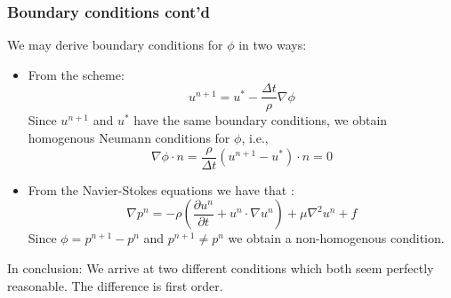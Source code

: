 \begin{frame}
\frametitle{Boundary conditions cont'd}
We may derive boundary conditions for 
$\phi$ in two ways: 
\begin{itemize}
\item From the scheme:  
\[
u^{n+1} =  u^*- \frac{\Delta t}{\rho} \nabla \phi 
\]
Since $u^{n+1}$ and $u^*$ have the same boundary conditions, we obtain homogenous
Neumann conditions for $\phi$, i.e., 
\[
\nabla \phi \cdot n  = \frac{\rho}{\Delta t}(u^{n+1} -  u^*) \cdot n = 0   
\]
\item From the Navier-Stokes equations we have that :  
\[
 \nabla p^n      =  - \rho (\frac{\partial u^n}{\partial t} + u^n \cdot \nabla u^n)
  + \mu \nabla^2 u^n + f 
\]
Since $\phi = p^{n+1} - p^n$ and $p^{n+1} \not = p^n$
we obtain a non-homogenous condition. 
\end{itemize}
In conclusion: We arrive at two different conditions which both 
seem perfectly reasonable. The difference is first order.  
\end{frame}
